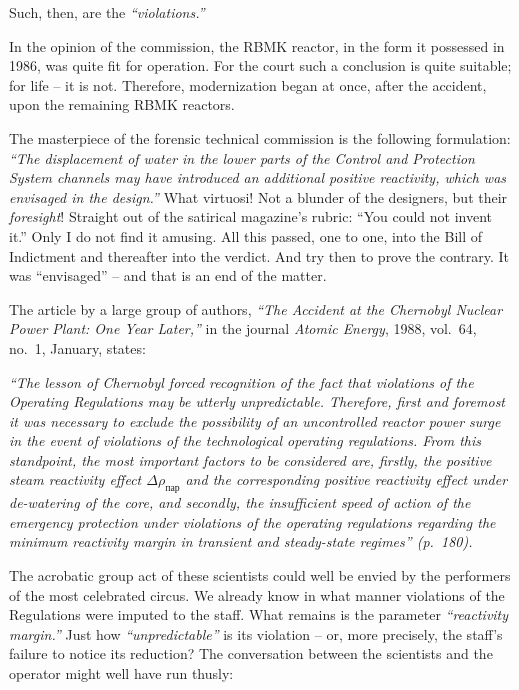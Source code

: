 \documentclass[openright]{bookest}
\begin{document}
Such, then, are the \textit{``violations.''}

In the opinion of the commission, the RBMK reactor, in the form it possessed in 1986, was quite fit for operation. For the court such a conclusion is quite suitable; for life -- it is not. Therefore, modernization began at once, after the accident, upon the remaining RBMK reactors.


The masterpiece of the forensic technical commission is the following formulation: \textit{``The displacement of water in the lower parts of the Control and Protection System channels may have introduced an additional positive reactivity, which was envisaged in the design.''} What virtuosi! Not a blunder of the designers, but their \textit{foresight}! Straight out of the satirical magazine's rubric: ``You could not invent it.'' Only I do not find it amusing. All this passed, one to one, into the Bill of Indictment and thereafter into the verdict. And try then to prove the contrary. It was ``envisaged'' -- and that is an end of the matter.

The article by a large group of authors, \textit{``The Accident at the Chernobyl Nuclear Power Plant: One Year Later,''} in the journal \textit{Atomic Energy}, 1988, vol.~64, no.~1, January, states:

\begin{personal}
\textit{``The lesson of Chernobyl forced recognition of the fact that violations of the Operating Regulations may be utterly unpredictable. Therefore, first and foremost it was necessary to exclude the possibility of an uncontrolled reactor power surge in the event of violations of the technological operating regulations. From this standpoint, the most important factors to be considered are, firstly, the positive steam reactivity effect $\Delta \rho_{\text{пар}}$ and the corresponding positive reactivity effect under de-watering of the core, and secondly, the insufficient speed of action of the emergency protection under violations of the operating regulations regarding the minimum reactivity margin in transient and steady-state regimes'' (p.~180).}
\end{personal}

The acrobatic group act of these scientists could well be envied by the performers of the most celebrated circus. We already know in what manner violations of the Regulations were imputed to the staff. What remains is the parameter \textit{``reactivity margin.''} Just how \textit{``unpredictable''} is its violation -- or, more precisely, the staff's failure to notice its reduction? The conversation between the scientists and the operator might well have run thusly:
\end{document}
